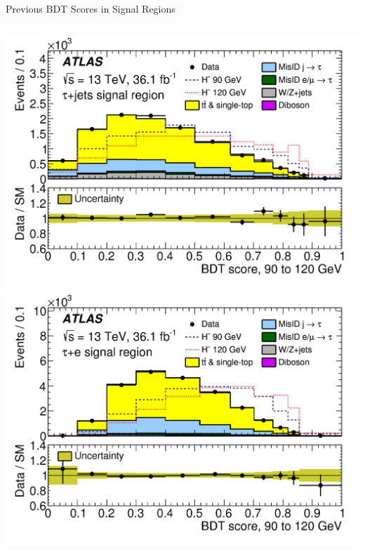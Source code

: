 \documentclass[aspectratio=169,xcolor=table]{beamer}
\begin{document}
      \begin{frame}[t]{Previous BDT Scores in Signal Regions}
        \begin{columns}[t]
          \includegraphics[height=.4\textheight,keepaspectratio=true]{taujet_SR_2018/taujet_SR_90to120_2018.png}
          \includegraphics[height=.4\textheight,keepaspectratio=true]{tauel_SR_2018/tauel_SR_90to120_2018.png}



\end{columns}
\end{frame}
\end{document}
